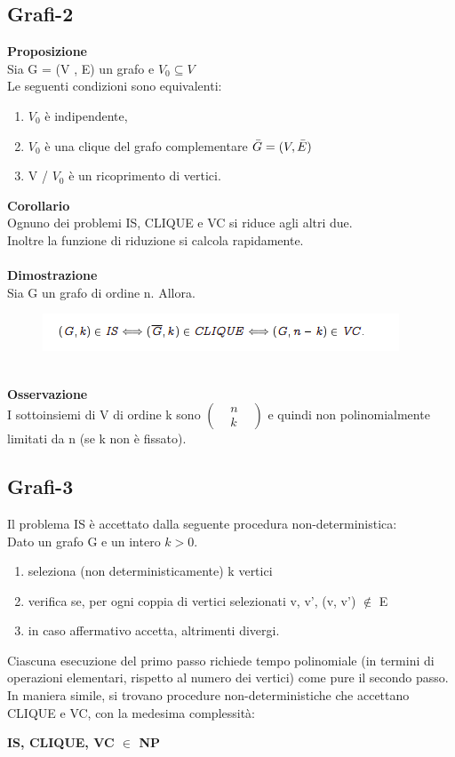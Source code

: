 \subsection{Grafi-2}
\textbf{Proposizione}\\
Sia G = (V , E) un grafo e $V_0 \subseteq V$\\
Le seguenti condizioni sono equivalenti:
\begin{enumerate}
    \item $V_0$ è indipendente,
    
    \item $V_0$ è una clique del grafo complementare $\Bar{G} = (V , \Bar{E})$
    
    \item V / $V_0$ è un ricoprimento di vertici.
\end{enumerate}
\textbf{Corollario}\\
Ognuno dei problemi IS, CLIQUE e VC si riduce agli altri due.\\
Inoltre la funzione di riduzione si calcola rapidamente.\\\\
\textbf{Dimostrazione}\\
Sia G un grafo di ordine n. Allora.\\
\begin{figure}[htp]
    \includegraphics[scale=0.9]{tesi_stile/img/foto2cap11.png}
\end{figure}\\
\textbf{Osservazione}\\
I sottoinsiemi di V di ordine k sono 
$
\begin{pmatrix}
& n & \\
& k &
\end{pmatrix}	
$
e quindi non polinomialmente limitati da n (se k non è fissato).
\subsection{Grafi-3}
Il problema IS è accettato dalla seguente procedura non-deterministica:\\
Dato un grafo G e un intero $k > 0$.
\begin{enumerate}
    \item seleziona (non deterministicamente) k vertici
    
    \item verifica se, per ogni coppia di vertici selezionati v, v', (v, v') $\notin$ E
    
    \item in caso affermativo accetta, altrimenti divergi.
\end{enumerate}
Ciascuna esecuzione del primo passo richiede tempo polinomiale (in termini di operazioni elementari, rispetto al numero dei vertici) come pure il secondo passo.\\
In maniera simile, si trovano procedure non-deterministiche che accettano CLIQUE e VC, con la medesima complessità:
\begin{center}
    \textbf{IS, CLIQUE, VC $\in$ NP}
\end{center}
